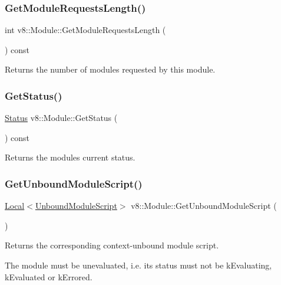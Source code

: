 \subsubsection{\texorpdfstring{Get\+Module\+Requests\+Length()}{GetModuleRequestsLength()}}
{\footnotesize\ttfamily int v8\+::\+Module\+::\+Get\+Module\+Requests\+Length (\begin{DoxyParamCaption}{ }\end{DoxyParamCaption}) const}

Returns the number of modules requested by this module. \mbox{\label{classv8_1_1Module_a6d5b11f191fdb9dc1778ed88333ba2bb}} 
\subsubsection{\texorpdfstring{Get\+Status()}{GetStatus()}}
{\footnotesize\ttfamily \mbox{\hyperlink{classv8_1_1Module_a9c2a22c9cb8e928d570c38648c648b7e}{Status}} v8\+::\+Module\+::\+Get\+Status (\begin{DoxyParamCaption}{ }\end{DoxyParamCaption}) const}

Returns the module\textquotesingle{}s current status. \mbox{\label{classv8_1_1Module_a47dc498d5645eef50ddceb874f5ed3a1}} 
\subsubsection{\texorpdfstring{Get\+Unbound\+Module\+Script()}{GetUnboundModuleScript()}}
{\footnotesize\ttfamily \mbox{\hyperlink{classv8_1_1Local}{Local}}$<$\mbox{\hyperlink{classv8_1_1UnboundModuleScript}{Unbound\+Module\+Script}}$>$ v8\+::\+Module\+::\+Get\+Unbound\+Module\+Script (\begin{DoxyParamCaption}{ }\end{DoxyParamCaption})}

Returns the corresponding context-\/unbound module script.

The module must be unevaluated, i.\+e. its status must not be k\+Evaluating, k\+Evaluated or k\+Errored. \mbox{\label{classv8_1_1Module_a2d7d35ce8451c547294fe9964f72d9ca}} 
